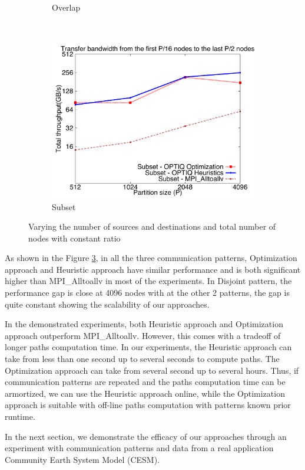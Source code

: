 \begin{figure}[!htbp]
\begin{subfigure}[b]{0.32\textwidth}
                \caption{Overlap}
                \label{fig:constantr_overlap_msg}
        \end{subfigure}
        ~ %
        \begin{subfigure}[b]{0.32\textwidth}
                \includegraphics[width=\textwidth]{figures/constantr_subset_msg.pdf}
                \caption{Subset}
                \label{fig:constantr_subset_msg}
        \end{subfigure}
        \caption{Varying the number of sources and destinations and total number of nodes with constant ratio}
        \label{fig:constantr_msg}
\end{figure}

As shown in the Figure \ref{fig:constantr_msg}, in all the three communication patterns, Optimization approach and Heuristic approach have similar performance and is both significant higher than MPI\_Alltoallv in most of the experiments. In Disjoint pattern, the performance gap is close at 4096 nodes with at the other 2 patterns, the gap is quite constant showing the scalability of our approaches.

In the demonstrated experiments, both Heuristic approach and Optimization approach outperform MPI\_Alltoallv. However, this comes with a tradeoff of longer paths computation time. In our experiments, the Heuristic approach can take from less than one second up to several seconds to compute paths. The Optimization approach can take from several second up to several hours. Thus, if communication patterns are repeated and the paths computation time can be armortized, we can use the Heuristic approach online, while the Optimization approach is suitable with off-line paths computation with patterns known prior runtime.

In the next section, we demonstrate the efficacy of our approaches through an experiment with communication patterns and data from a real application Community Earth System Model (CESM).
